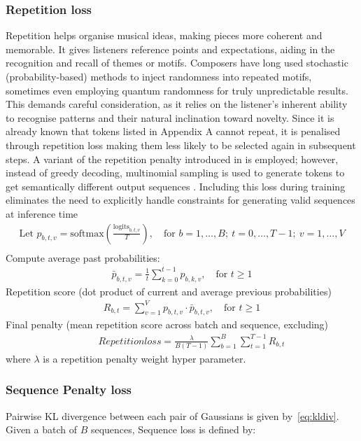 \documentclass[twoside,11pt]{article}
\begin{document}
\subsubsection{Repetition loss}
Repetition helps organise musical ideas, making pieces more 
coherent and memorable. It gives listeners reference points and expectations, 
aiding in the recognition and recall of themes or motifs. \cite{Hu_2022}
Composers have long used stochastic (probability-based) methods to inject randomness into repeated motifs, 
sometimes even employing quantum randomness for truly unpredictable results. \cite{yamada_grandi_munoz-gil_barbiero_aloy_lewenstein_2021} This demands careful consideration, as it relies on the listener's inherent ability to recognise patterns and their natural inclination toward novelty. 
Since it is already known that tokens listed in Appendix A cannot repeat, it is penalised through repetition loss making them less likely to be selected again in subsequent steps. 
A variant of the repetition penalty introduced in \cite{reppenalty} is employed; however, instead of greedy decoding, multinomial sampling is used to generate tokens to get semantically different output sequences \cite{song2024}. Including this loss during training eliminates the need to explicitly handle constraints for generating valid sequences at inference time
\begin{align}
\text{Let } p_{b,t,v} = \text{softmax}\left( \frac{\text{logits}_{b,t,v}}{T} \right), \quad \text{for } b = 1,\dots,B;\ t = 0,\dots,T-1;\ v = 1,\dots,V \\[1ex]
\end{align}
Compute average past probabilities:
\begin{align}
\bar{p}_{b,t,v} = \frac{1}{t} \sum_{k=0}^{t-1} p_{b,k,v}, \quad \text{for } t \geq 1
\end{align}
Repetition score (dot product of current and average previous probabilities)
\begin{align}
R_{b,t} = \sum_{v=1}^{V} p_{b,t,v} \cdot \bar{p}_{b,t,v}, \quad \text{for } t \geq 1
\end{align}
Final penalty (mean repetition score across batch and sequence, excluding)
\begin{align}
\qquad Repetition loss = \frac{\lambda}{B(T - 1)} \sum_{b=1}^{B} \sum_{t=1}^{T-1} R_{b,t}
\end{align}
where $\lambda$ is a repetition penalty weight hyper parameter.

\subsubsection{Sequence Penalty loss}
Pairwise KL divergence between each pair of Gaussians is given by~\eqref{eq:kldiv}. 
Given a batch of \( B \) sequences, Sequence loss is defined by:
\end{document}
